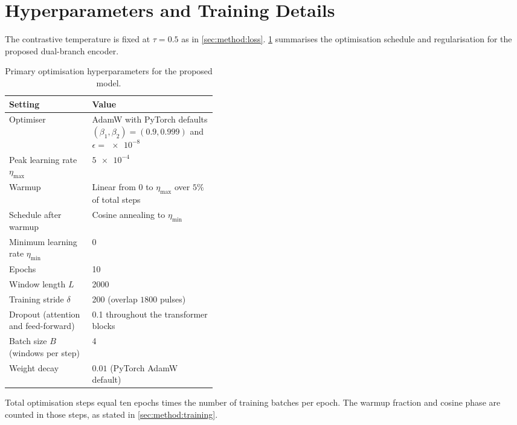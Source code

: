 \section{Hyperparameters and Training Details}\label{sec:exp:hparams}

The contrastive temperature is fixed at $\tau = \num{0.5}$ as in \cref{sec:method:loss}.
\cref{tab:exp:hparams_main} summarises the optimisation schedule and regularisation for the proposed dual-branch encoder.

\begin{table}[t]
  \centering
  \caption{Primary optimisation hyperparameters for the proposed model.}
  \label{tab:exp:hparams_main}
  \begin{tabularx}{\linewidth}{@{}>{\raggedright\arraybackslash}p{0.40\linewidth}>{\raggedright\arraybackslash}X@{}}
    \toprule
    Setting & Value \\
    \midrule
    Optimiser & AdamW \parencite{loshchilov2019adamw} with PyTorch defaults\newline
    $(\beta_1,\beta_2) = (0.9,0.999)$ and $\epsilon = \num{e-8}$ \\
    Peak learning rate $\eta_{\max}$ & $\num{5e-4}$ \\
    Warmup & Linear from $0$ to $\eta_{\max}$ over $5\%$ of total steps \parencite{goyal2017accurate} \\
    Schedule after warmup & Cosine annealing to $\eta_{\min}$ \parencite{loshchilov2017sgdr} \\
    Minimum learning rate $\eta_{\min}$ & \num{0} \\
    Epochs & \num{10} \\
    Window length $L$ & \num{2000} \\
    Training stride $\delta$ & \num{200} (overlap $1800$ pulses) \\
    Dropout (attention and feed-forward) & \num{0.1} throughout the transformer blocks \\
    Batch size $B$ (windows per step) & \num{4} \\
    Weight decay & $\num{0.01}$ (PyTorch AdamW default) \\
    \bottomrule
  \end{tabularx}
\end{table}

Total optimisation steps equal ten epochs times the number of training batches per epoch.
The warmup fraction and cosine phase are counted in those steps, as stated in \cref{sec:method:training}.

